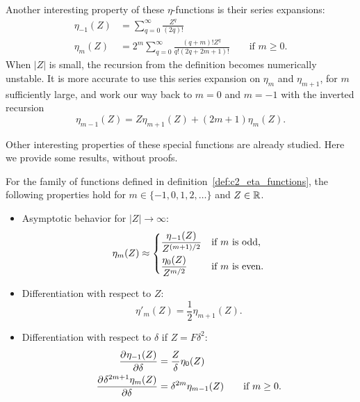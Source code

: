 Another interesting property of these $\eta$-functions is their series expansions:\begin{align*}
    \eta_{-1}(Z) & = \sum_{q=0}^{\infty} \frac{Z^q}{(2q)!}                                                          \\
    \eta_{m}(Z)  & = 2^m \sum_{q=0}^{\infty} \frac{(q+m)! Z^q}{q!(2q + 2m + 1)!} \qquad \text{if } m \geq 0\text{.}
\end{align*}
When $|Z|$ is small, the recursion from the definition becomes numerically unstable. It is more accurate to use this series expansion on $\eta_m$ and $\eta_{m+1}$, for $m$ sufficiently large, and work our way back to $m=0$ and $m=-1$ with the inverted recursion
$$
    \eta_{m-1}(Z) = Z \eta_{m+1}(Z) + (2 m + 1) \eta_{m}(Z)
    \text{.}
$$

Other interesting properties of these special functions are already studied. Here we provide some results, without proofs.
\begin{theorem}[Ixaru 1984]\label{the:c2_eta_functions}
    For the family of functions defined in definition~\ref{def:c2_eta_functions}, the following properties hold for $m \in \{-1, 0, 1, 2, \dots\}$ and $Z \in \mathbb{R}$.
    \begin{itemize}
        \item Asymptotic behavior for $|Z| \to \infty$:
              $$\eta_m(Z) \approx  \begin{dcases}
                      \frac{\eta_{-1}(Z)}{Z^{(m+1)/2}} & \text{if $m$ is odd,}  \\
                      \frac{\eta_{0}(Z)}{Z^{m/2}}      & \text{if $m$ is even.}
                  \end{dcases}$$
        \item Differentiation with respect to $Z$:
              $$
                  \eta'_{m}(Z) = \frac{1}{2}\eta_{m+1}(Z)\text{.}
              $$
        \item Differentiation with respect to $\delta$ if $Z = F\delta^2$:
              \begin{align*}
                  \pdv[]{\eta_{-1}(Z)}{\delta}             & = \frac{Z}{\delta} \eta_0(Z)                             \\
                  \pdv[]{\delta^{2m+1}\eta_{m}(Z)}{\delta} & = \delta^{2m} \eta_{m-1}(Z) \qquad \text{if $m \geq 0$.} \\
              \end{align*}
    \end{itemize}
\end{theorem}

